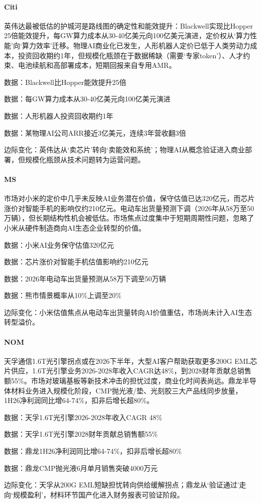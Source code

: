 \documentclass[11pt]{ctexart}
\begin{document}
\paragraph{Citi} 英伟达最被低估的护城河是路线图的确定性和能效提升：Blackwell实现比Hopper 25倍能效提升，每GW算力成本从30-40亿美元向100亿美元演进，定价权从‘算力性能’向‘算力效率’迁移。物理AI商业化已发生，人形机器人定价已低于人类劳动力成本，投资回收期约1年，但规模化瓶颈在于数据稀缺（需要‘专家token’）、人才约束、电池续航和高部署成本，短期回报来自专用AMR。
{\small\color{refgray}数据：Blackwell比Hopper能效提升25倍\par}
{\small\color{refgray}数据：每GW算力成本从30-40亿美元向100亿美元演进\par}
{\small\color{refgray}数据：人形机器人投资回收期约1年\par}
{\small\color{refgray}数据：某物理AI公司ARR接近3亿美元，连续3年营收翻3倍\par}
{\small\color{refgray}边际变化：英伟达从‘卖芯片’转向‘卖能效和系统’；物理AI从概念验证进入商业部署，但规模化瓶颈从技术问题转为运营问题。\par}
\paragraph{MS} 市场对小米的定价中几乎未反映AI业务潜在价值，保守估值已达320亿元，而芯片涨价对智能手机的影响仅约210亿元。电动车出货量预测下调（2026年从58万至50万辆），但长期结构性机会被低估。市场焦点过度集中于短期周期性问题，忽略了小米从硬件制造商向AI生态企业转型的价值。
{\small\color{refgray}数据：小米AI业务保守估值320亿元\par}
{\small\color{refgray}数据：芯片涨价对智能手机估值影响约210亿元\par}
{\small\color{refgray}数据：2026年电动车出货量预测从58万下调至50万辆\par}
{\small\color{refgray}数据：熊市情景概率从10\%上调至20\%\par}
{\small\color{refgray}边际变化：小米估值焦点从电动车出货量转向AI价值重估，市场尚未计入AI生态转型溢价。\par}
\paragraph{NOM} 天孚通信1.6T光引擎拐点或在2026下半年，大型AI客户帮助获取更多200G EML芯片供应，1.6T光引擎业务2026-2028年收入CAGR达48\%，到2028财年贡献总销售额55\%。市场对玻璃基板等新技术冲击的担忧过度，商业化时间表尚远。鼎龙半导体材料业务进入规模化阶段，CMP抛光液/垫、光刻胶三大产品线同步放量，1H26净利润同比增64-74\%，扣非后增长超80\%。
{\small\color{refgray}数据：天孚1.6T光引擎2026-2028年收入CAGR 48\%\par}
{\small\color{refgray}数据：天孚1.6T光引擎2028财年贡献总销售额55\%\par}
{\small\color{refgray}数据：鼎龙1H26净利润同比增64-74\%，扣非后增长超80\%\par}
{\small\color{refgray}数据：鼎龙CMP抛光液6月单月销售突破4000万元\par}
{\small\color{refgray}边际变化：天孚从200G EML短缺担忧转向供给缓解拐点；鼎龙从‘验证通过’走向‘规模盈利’，材料环节国产化进入财务报表可验证阶段。\par}
\end{document}
